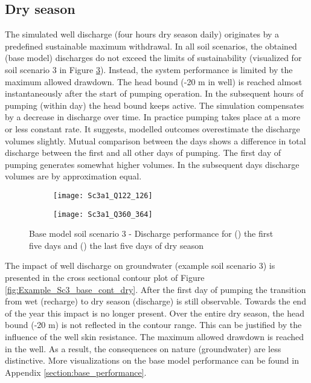 \subsection{Dry season}
The simulated well discharge (four hours dry season daily) originates by a predefined sustainable maximum withdrawal. In all soil scenarios, the obtained (base model) discharges do not exceed the limits of sustainability (visualized for soil scenario 3 in Figure \ref{fig:Example_Sc3_base_discharge}). Instead, the system performance is limited by the maximum allowed drawdown. The head bound (-20 m in well) is reached almost instantaneously after the start of pumping operation. In the subsequent hours of pumping (within day) the head bound keeps active. The simulation compensates by a decrease in discharge over time. In practice pumping takes place at a more or less constant rate. It suggests, modelled outcomes overestimate the discharge volumes slightly. Mutual comparison between the days shows a difference in total discharge between the first and all other days of pumping. The first day of pumping generates somewhat higher volumes. In the subsequent days discharge volumes are by approximation equal. \\

\begin{figure}[H]
	\centering
	\begin{subfigure}[b]{0.5\linewidth}
		\centering\texttt{[image: Sc3a1\_Q122\_126]}
		\captionsetup{justification=centering}		
		\caption{\label{fig:Sc3a1_Q122_126}}
		\end{subfigure}\hfill
	\begin{subfigure}[b]{0.5\linewidth}
        \centering\texttt{[image: Sc3a1\_Q360\_364]}
		\captionsetup{justification=centering}		
		\caption{\label{fig:Sc3a1_Q360_364}}
		\end{subfigure}
		\captionsetup{justification=centering}	
	\caption{Base model soil scenario 3 - Discharge performance for   () the first five days and () the last five days of dry season} 
	\label{fig:Example_Sc3_base_discharge}
\end{figure} 

The impact of well discharge on groundwater (example soil scenario 3) is presented in the cross sectional contour plot of Figure \ref{fig:Example_Sc3_base_cont_dry}. After the first day of pumping the transition from wet (recharge) to dry season (discharge) is still observable. Towards the end of the year this impact is no longer present. Over the entire dry season, the head bound (-20 m) is not reflected in the contour range. This can be justified by the influence of the well skin resistance. The maximum allowed drawdown is reached in the well. As a result, the consequences on nature (groundwater) are less distinctive. More visualizations on the base model performance can be found in Appendix \ref{section:base_performance}. \\

